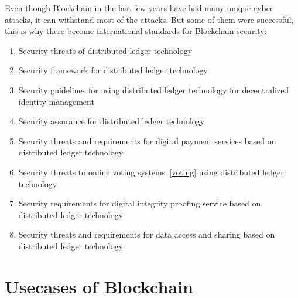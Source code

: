 \documentclass[10pt,english,a4paper]{article}
\begin{document}
Even though Blockchain in the last few years have had many unique cyber-attacks, it can withstand most of the attacks. But some of them were successful, this is why there become international standards for Blockchain security:\cite{Xiaofen:Blockchain-security}
\begin{enumerate}
    \item Security threats of distributed ledger technology\cite{Xiaofen:Blockchain-security}
    \item Security framework for distributed ledger technology\cite{Xiaofen:Blockchain-security}
    \item Security guidelines for using distributed ledger technology for decentralized \cite{Xiaofen:Blockchain-security}identity management\cite{Xiaofen:Blockchain-security}
    \item Security assurance for distributed ledger technology\cite{Xiaofen:Blockchain-security}
    \item Security threats and requirements for digital payment services based on distributed ledger technology\cite{Xiaofen:Blockchain-security}
    \item Security threats to online voting systems~\ref{voting} using distributed ledger technology\cite{Xiaofen:Blockchain-security}
    \item Security requirements for digital integrity proofing service based on distributed ledger technology\cite{Xiaofen:Blockchain-security}
    \item Security threats and requirements for data access and sharing based on distributed ledger technology\cite{Xiaofen:Blockchain-security}
\end{enumerate}
   
  
\section{Usecases of Blockchain}\label{Blockchain}
\end{document}
